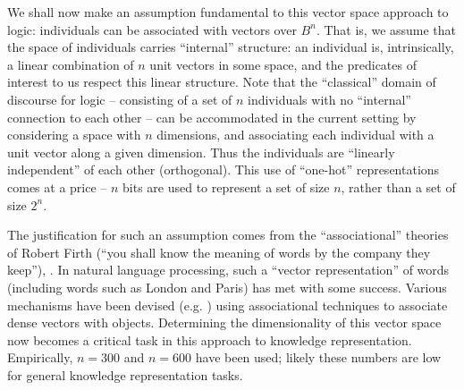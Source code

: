 \documentclass{article} %
\begin{document}
We shall now make an assumption fundamental to this vector space approach to logic: individuals can be associated with vectors over \(B^n\). That is, we assume that the space of individuals carries ``internal'' structure: an individual is, intrinsically, a linear combination of \(n\) unit vectors in some space, and the predicates of interest to us respect this linear structure. Note that the ``classical'' domain of discourse for logic -- consisting of a set of \(n\) individuals with no ``internal'' connection to each other -- can be accommodated in the current setting by considering a space with \(n\) dimensions, and associating each individual with a unit vector along a given dimension. Thus the individuals are ``linearly independent'' of each other (orthogonal). This use of ``one-hot'' representations comes at a price -- $n$ bits are used to represent a set of size \(n\), rather than a set of size \(2^n\). %

The justification for such an assumption  comes from the ``associational'' theories of Robert Firth (``you shall know the meaning of words by the company they keep''), \cite{firth-57}. In natural language processing, such a ``vector representation'' of words (including words such as {\sc London} and {\sc Paris}) has met with some success.  Various mechanisms have been devised (e.g.{} \cite{word-to-vec}) using associational techniques to associate dense vectors with objects. Determining the dimensionality of this vector space now becomes a critical task in this approach to knowledge representation. Empirically, \(n=300\) and \(n=600\) have been used; likely these numbers are low for general knowledge representation tasks. 

\end{document}
